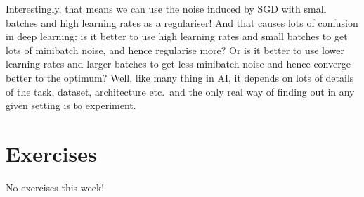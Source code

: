 \documentclass{article}
\newcommand{\0}{\mathbf{0}}
\begin{document}
Interestingly, that means we can use the noise induced by SGD with small batches and high learning rates as a regulariser!
And that causes lots of confusion in deep learning: is it better to use high learning rates and small batches to get lots of minibatch noise, and hence regularise more?  
Or is it better to use lower learning rates and larger batches to get less minibatch noise and hence converge better to the optimum?
Well, like many thing in AI, it depends on lots of details of the task, dataset, architecture etc.\ and the only real way of finding out in any given setting is to experiment.

\section{Exercises}

No exercises this week!
\end{document}
